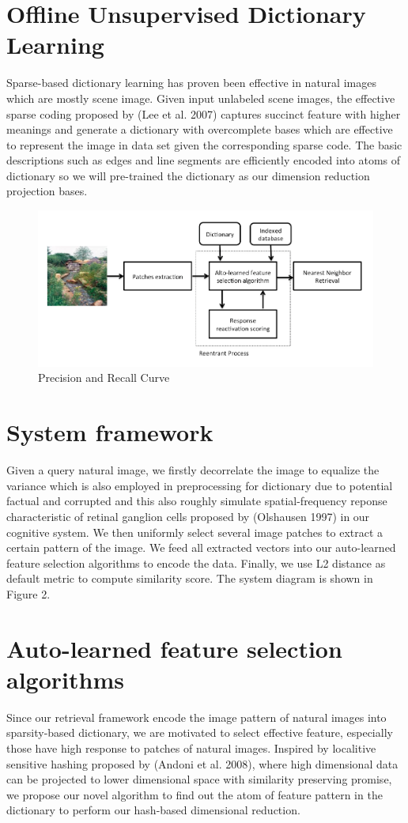 \documentclass[letterpaper]{article}
\begin{document}
\section{Offline Unsupervised Dictionary Learning}
Sparse-based dictionary learning has proven been effective in natural images which are mostly scene image. Given input unlabeled scene images, the effective sparse coding proposed by (Lee et al. 2007) captures succinct feature with higher meanings and generate a dictionary with overcomplete bases which are effective to represent the image in data set given the corresponding sparse code. The basic descriptions such as edges and line segments are efficiently encoded into atoms of dictionary so we will pre-trained the dictionary as our dimension reduction projection bases. %

\begin{figure}[!ht]
		\centering
		\includegraphics[width=.4\textwidth]{figures_dir/system_query.png}
		\caption{Precision and Recall Curve}
		\label{cottage_garden_top10_comparison}
\end{figure}


\section{System framework}
Given a query natural image, we firstly decorrelate the image to equalize the variance which is also employed in preprocessing for dictionary due to potential factual and corrupted and this also roughly simulate spatial-frequency reponse characteristic of retinal ganglion cells proposed by (Olshausen 1997) in our cognitive system.  We then uniformly select several image patches to extract a certain pattern of the image. We feed all extracted vectors into our auto-learned feature selection algorithms to encode the data. Finally, we use L2 distance as default metric to compute similarity score. The system diagram is shown in Figure 2.

\section{Auto-learned feature selection algorithms}
Since our retrieval framework encode the image pattern of natural images into sparsity-based dictionary, we are motivated to select effective feature, especially those have high response to patches of natural images. Inspired by localitive sensitive hashing proposed by (Andoni et al. 2008), where high dimensional data can be projected to lower dimensional space with similarity preserving promise, we propose our novel algorithm to find out the atom of feature pattern in the dictionary to perform our hash-based dimensional reduction.
\end{document}
